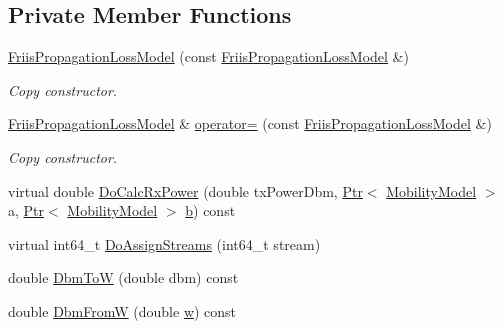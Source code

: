 \subsection*{Private Member Functions}
\begin{DoxyCompactItemize}
\item 
\hyperlink{classns3_1_1FriisPropagationLossModel_a92d88a911bad7e32df0518a083f2a26a}{Friis\+Propagation\+Loss\+Model} (const \hyperlink{classns3_1_1FriisPropagationLossModel}{Friis\+Propagation\+Loss\+Model} \&)
\begin{DoxyCompactList}\small\item\em Copy constructor. \end{DoxyCompactList}\item 
\hyperlink{classns3_1_1FriisPropagationLossModel}{Friis\+Propagation\+Loss\+Model} \& \hyperlink{classns3_1_1FriisPropagationLossModel_a47736c8252dfdcf7d399b4edecfcc700}{operator=} (const \hyperlink{classns3_1_1FriisPropagationLossModel}{Friis\+Propagation\+Loss\+Model} \&)
\begin{DoxyCompactList}\small\item\em Copy constructor. \end{DoxyCompactList}\item 
virtual double \hyperlink{classns3_1_1FriisPropagationLossModel_afa96b418174d515984c9e5f79af399dd}{Do\+Calc\+Rx\+Power} (double tx\+Power\+Dbm, \hyperlink{classns3_1_1Ptr}{Ptr}$<$ \hyperlink{classns3_1_1MobilityModel}{Mobility\+Model} $>$ a, \hyperlink{classns3_1_1Ptr}{Ptr}$<$ \hyperlink{classns3_1_1MobilityModel}{Mobility\+Model} $>$ \hyperlink{lte__pathloss_8m_a21ad0bd836b90d08f4cf640b4c298e7c}{b}) const 
\item 
virtual int64\+\_\+t \hyperlink{classns3_1_1FriisPropagationLossModel_a0d8f351ee9220bb66dd8c61165c01d07}{Do\+Assign\+Streams} (int64\+\_\+t stream)
\item 
double \hyperlink{classns3_1_1FriisPropagationLossModel_adc3df4190e312f7608993f5372188d58}{Dbm\+ToW} (double dbm) const 
\item 
double \hyperlink{classns3_1_1FriisPropagationLossModel_a8cc13a6c761429068491027a2fe74096}{Dbm\+FromW} (double \hyperlink{mmwave_2model_2fading-traces_2fading__trace__generator_8m_afd61ec66f9d7b807eece6eb12c781844}{w}) const 
\end{DoxyCompactItemize}

